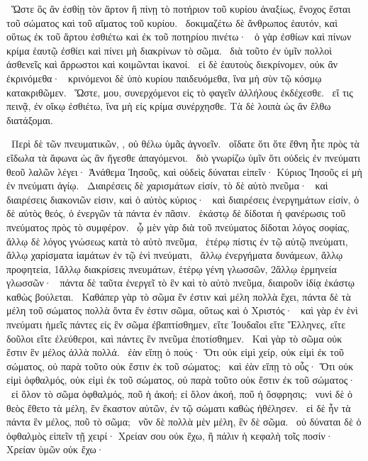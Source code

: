 ~Ὥστε ὃς ἂν ἐσθίῃ τὸν ἄρτον ἢ πίνῃ τὸ ποτήριον τοῦ κυρίου ἀναξίως, ἔνοχος ἔσται τοῦ σώματος καὶ τοῦ αἵματος τοῦ κυρίου.
~δοκιμαζέτω δὲ ἄνθρωπος ἑαυτόν, καὶ οὕτως ἐκ τοῦ ἄρτου ἐσθιέτω καὶ ἐκ τοῦ ποτηρίου πινέτω·
~ὁ γὰρ ἐσθίων καὶ πίνων κρίμα ἑαυτῷ ἐσθίει καὶ πίνει μὴ διακρίνων τὸ σῶμα.
~διὰ τοῦτο ἐν ὑμῖν πολλοὶ ἀσθενεῖς καὶ ἄρρωστοι καὶ κοιμῶνται ἱκανοί.
~εἰ δὲ ἑαυτοὺς διεκρίνομεν, οὐκ ἂν ἐκρινόμεθα·
~κρινόμενοι δὲ ὑπὸ κυρίου παιδευόμεθα, ἵνα μὴ σὺν τῷ κόσμῳ κατακριθῶμεν.
~Ὥστε,  μου, συνερχόμενοι εἰς τὸ φαγεῖν ἀλλήλους ἐκδέχεσθε.
~εἴ τις πεινᾷ, ἐν οἴκῳ ἐσθιέτω, ἵνα μὴ εἰς κρίμα συνέρχησθε. Τὰ δὲ λοιπὰ ὡς ἂν ἔλθω διατάξομαι.

~Περὶ δὲ τῶν πνευματικῶν, , οὐ θέλω ὑμᾶς ἀγνοεῖν.
~οἴδατε ὅτι ὅτε ἔθνη ἦτε πρὸς τὰ εἴδωλα τὰ ἄφωνα ὡς ἂν ἤγεσθε ἀπαγόμενοι.
~διὸ γνωρίζω ὑμῖν ὅτι οὐδεὶς ἐν πνεύματι θεοῦ λαλῶν λέγει· Ἀνάθεμα Ἰησοῦς, καὶ οὐδεὶς δύναται εἰπεῖν· Κύριος Ἰησοῦς εἰ μὴ ἐν πνεύματι ἁγίῳ.
~Διαιρέσεις δὲ χαρισμάτων εἰσίν, τὸ δὲ αὐτὸ πνεῦμα·
~καὶ διαιρέσεις διακονιῶν εἰσιν, καὶ ὁ αὐτὸς κύριος·
~καὶ διαιρέσεις ἐνεργημάτων εἰσίν, ὁ δὲ αὐτὸς θεός, ὁ ἐνεργῶν τὰ πάντα ἐν πᾶσιν.
~ἑκάστῳ δὲ δίδοται ἡ φανέρωσις τοῦ πνεύματος πρὸς τὸ συμφέρον.
~ᾧ μὲν γὰρ διὰ τοῦ πνεύματος δίδοται λόγος σοφίας, ἄλλῳ δὲ λόγος γνώσεως κατὰ τὸ αὐτὸ πνεῦμα,
~ἑτέρῳ πίστις ἐν τῷ αὐτῷ πνεύματι, ἄλλῳ χαρίσματα ἰαμάτων ἐν τῷ ἑνὶ πνεύματι,
~ἄλλῳ ἐνεργήματα δυνάμεων, ἄλλῳ προφητεία, 1ἄλλῳ διακρίσεις πνευμάτων, ἑτέρῳ γένη γλωσσῶν, 2ἄλλῳ ἑρμηνεία γλωσσῶν·
~πάντα δὲ ταῦτα ἐνεργεῖ τὸ ἓν καὶ τὸ αὐτὸ πνεῦμα, διαιροῦν ἰδίᾳ ἑκάστῳ καθὼς βούλεται.
~Καθάπερ γὰρ τὸ σῶμα ἕν ἐστιν καὶ μέλη πολλὰ ἔχει, πάντα δὲ τὰ μέλη τοῦ σώματος πολλὰ ὄντα ἕν ἐστιν σῶμα, οὕτως καὶ ὁ Χριστός·
~καὶ γὰρ ἐν ἑνὶ πνεύματι ἡμεῖς πάντες εἰς ἓν σῶμα ἐβαπτίσθημεν, εἴτε Ἰουδαῖοι εἴτε Ἕλληνες, εἴτε δοῦλοι εἴτε ἐλεύθεροι, καὶ πάντες ἓν πνεῦμα ἐποτίσθημεν.
~Καὶ γὰρ τὸ σῶμα οὐκ ἔστιν ἓν μέλος ἀλλὰ πολλά.
~ἐὰν εἴπῃ ὁ πούς· Ὅτι οὐκ εἰμὶ χείρ, οὐκ εἰμὶ ἐκ τοῦ σώματος, οὐ παρὰ τοῦτο οὐκ ἔστιν ἐκ τοῦ σώματος;
~καὶ ἐὰν εἴπῃ τὸ οὖς· Ὅτι οὐκ εἰμὶ ὀφθαλμός, οὐκ εἰμὶ ἐκ τοῦ σώματος, οὐ παρὰ τοῦτο οὐκ ἔστιν ἐκ τοῦ σώματος·
~εἰ ὅλον τὸ σῶμα ὀφθαλμός, ποῦ ἡ ἀκοή; εἰ ὅλον ἀκοή, ποῦ ἡ ὄσφρησις;
~νυνὶ δὲ ὁ θεὸς ἔθετο τὰ μέλη, ἓν ἕκαστον αὐτῶν, ἐν τῷ σώματι καθὼς ἠθέλησεν.
~εἰ δὲ ἦν τὰ πάντα ἓν μέλος, ποῦ τὸ σῶμα;
~νῦν δὲ πολλὰ μὲν μέλη, ἓν δὲ σῶμα.
~οὐ δύναται δὲ ὁ ὀφθαλμὸς εἰπεῖν τῇ χειρί· Χρείαν σου οὐκ ἔχω, ἢ πάλιν ἡ κεφαλὴ τοῖς ποσίν· Χρείαν ὑμῶν οὐκ ἔχω·
